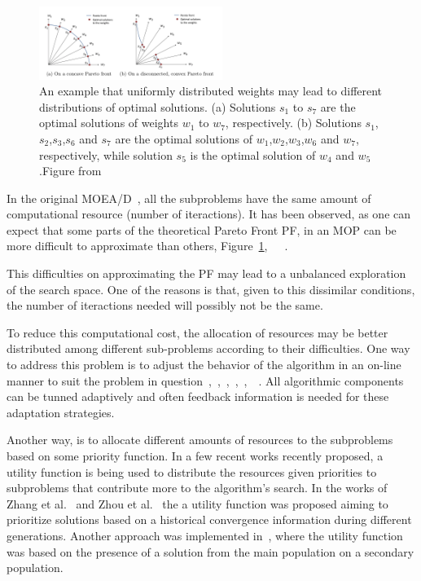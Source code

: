 \documentclass{IEEEtran}
\begin{document}
\begin{figure}[h]
	\centering
	\includegraphics[width=0.53\textwidth]{img/harder_problems2}
	\caption{An example that uniformly distributed weights may lead to different distributions of optimal solutions. (a) Solutions $s_1$ to $s_7$ are the optimal solutions of weights $w_1$ to $w_7$, respectively. (b) Solutions $s_1$,$s_2$,$s_3$,$s_6$ and $s_7$ are the optimal solutions of $w_1$,$w_2$,$w_3$,$w_6$ and $w_7$, respectively, while solution $s_5$ is the optimal solution of $w_4$ and $w_5$.Figure from~\cite{li2017weights}}
	\label{fig3}
\end{figure}

In the original MOEA/D~\cite{zhang2007moea}, all the subproblems have the same amount of computational resource (number of iteractions). It has been observed, as one can expect that some parts of the theoretical Pareto Front PF, in an MOP can be more difficult to approximate than others, Figure~\ref{fig3},~\cite{zhang2009performance}~\cite{zhou2016all}~\cite{kang2018collaborative}.


This difficulties on approximating the PF may lead to a unbalanced exploration of the search space. One of the reasons is that, given to this dissimilar conditions, the number of iteractions needed will possibly not be the same. 

 To reduce this computational cost, the allocation of resources may be better distributed among different sub-problems according to their difficulties. One way to address this problem is to adjust the behavior of the algorithm in an on-line manner to suit the problem in question~\cite{hinterding1997adaptation},~\cite{de2007parameter},~\cite{meyer2007self},~\cite{zhang2009performance},~\cite{kramer2010evolutionary},~\cite{zhang2012survey}~\cite{cai2015external}. All algorithmic components can be tunned adaptively and often feedback information is needed for these adaptation strategies. 

Another way, is to allocate different amounts of resources to the subproblems based on some priority function. In a few recent works recently proposed, a utility function is being used to distribute the resources given priorities to subproblems that contribute more to the algorithm's search.  In the works of Zhang et al.~\cite{zhang2009performance} and Zhou et al.~\cite{zhou2016all} the a utility function was proposed aiming to prioritize solutions based on a historical convergence information during different generations. Another approach was implemented in~\cite{kang2018collaborative}, where the utility function was based on the presence of a solution from the main population on a secondary population.
\end{document}
